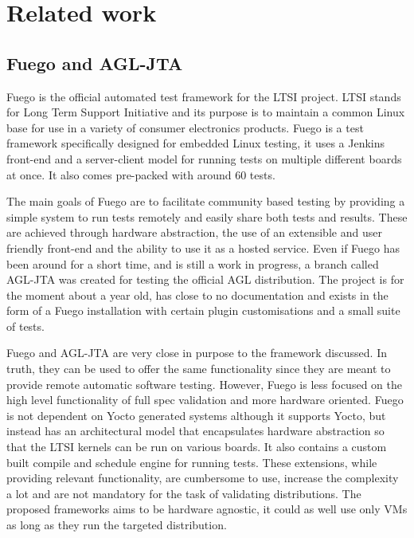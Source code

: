 \section{Related work}

\subsection{Fuego and AGL-JTA}
Fuego is the official automated test framework for the LTSI project. LTSI stands for Long Term Support Initiative and its purpose is to maintain a common Linux base for use in a variety of consumer electronics products. Fuego is a test framework specifically designed for embedded Linux testing, it uses a Jenkins front-end and a server-client model for running tests on multiple different boards at once. It also comes pre-packed with around 60 tests.

The main goals of Fuego are to facilitate community based testing by providing a simple system to run tests remotely and easily share both tests and results. These are achieved through hardware abstraction, the use of an extensible and user friendly front-end and the ability to use it as a hosted service. Even if Fuego has been around for a short time, and is still a work in progress, a branch called AGL-JTA was created for testing the official AGL distribution. The project is for the moment about a year old, has close to no documentation and exists in the form of a Fuego installation with certain plugin customisations and a small suite of tests.

Fuego and AGL-JTA are very close in purpose to the framework discussed. In truth, they can be used to offer the same functionality since they are meant to provide remote automatic software testing. However, Fuego is less focused on the high level functionality of full spec validation and more hardware oriented. Fuego is not dependent on Yocto generated systems although it supports Yocto, but instead has an architectural model that encapsulates hardware abstraction so that the LTSI kernels can be run on various boards. It also contains a custom built compile and schedule engine for running tests. These extensions, while providing relevant functionality, are cumbersome to use, increase the complexity a lot and are not mandatory for the task of validating distributions. The proposed frameworks aims to be hardware agnostic, it could as well use only VMs as long as they run the targeted distribution.

